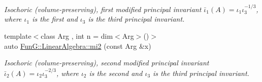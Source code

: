 \begin{DoxyCompactItemize}
\begin{DoxyCompactList}\small\item\em \-Isochoric (volume-\/preserving), first modified principal invariant $ \bar\iota_1(A)=\iota_1\iota_3^{-1/3} $, where $\iota_1$ is the first and $\iota_3$ is the third principal invariant. \end{DoxyCompactList}\item 
{\footnotesize template$<$class Arg , int n = dim$<$\-Arg$>$()$>$ }\\auto \hyperlink{group__InvariantGroup_ga9d219c5c48cce1d3af60345916963524}{\-Fun\-G\-::\-Linear\-Algebra\-::mi2} (const \-Arg \&x)
\begin{DoxyCompactList}\small\item\em \-Isochoric (volume-\/preserving), second modified principal invariant $ \bar\iota_2(A)=\iota_2\iota_3^{-2/3} $, where $\iota_2$ is the second and $\iota_3$ is the third principal invariant. \end{DoxyCompactList}\end{DoxyCompactItemize}

